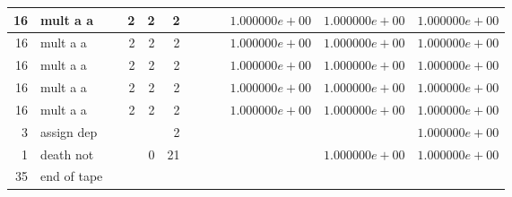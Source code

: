 \documentclass{article}
\begin{document}
\begin{tabular}{|r|l|r|r|r|r||r|r||r|r|r|r|}
16 & mult a a & & 2 & 2 & 2 & & & &$ 1.000000e+00 $&$ 1.000000e+00 $&$ 1.000000e+00 $\\ \hline 
16 & mult a a & & 2 & 2 & 2 & & & &$ 1.000000e+00 $&$ 1.000000e+00 $&$ 1.000000e+00 $\\ \hline 
16 & mult a a & & 2 & 2 & 2 & & & &$ 1.000000e+00 $&$ 1.000000e+00 $&$ 1.000000e+00 $\\ \hline 
16 & mult a a & & 2 & 2 & 2 & & & &$ 1.000000e+00 $&$ 1.000000e+00 $&$ 1.000000e+00 $\\ \hline 
16 & mult a a & & 2 & 2 & 2 & & & &$ 1.000000e+00 $&$ 1.000000e+00 $&$ 1.000000e+00 $\\ \hline 
3 & assign dep & & & & 2 & & & & & &$ 1.000000e+00 $\\ \hline 
1 & death not & & & 0 & 21 & & & & &$ 1.000000e+00 $&$ 1.000000e+00 $\\ \hline 
 35 & end of tape & & & & & & & & & &  \\ \hline 
\end{tabular}
\end{document}

